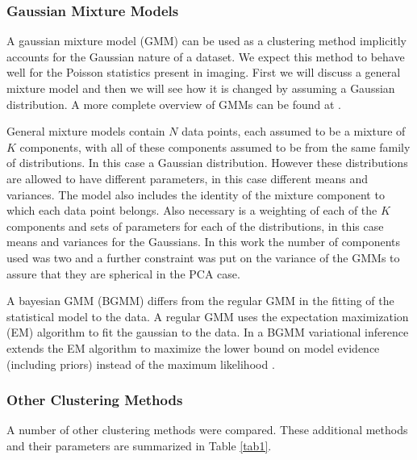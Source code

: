 \documentclass[a4paper,11pt]{article}
\begin{document}
\subsubsection{Gaussian Mixture Models}

A gaussian mixture model (GMM) can be used as a clustering method implicitly accounts for the Gaussian nature of a dataset. We expect this method to behave well for the Poisson statistics present in imaging. First we will discuss a general mixture model and then we will see how it is changed by assuming a Gaussian distribution. A more complete overview of GMMs can be found at \cite{DinovExpectationTutorial}.

General mixture models contain $N$ data points, each assumed to be a mixture of $K$ components, with all of these components assumed to be from the same family of distributions. In this case a Gaussian distribution. However these distributions are allowed to have different parameters, in this case different means and variances. The model also includes the identity of the mixture component to which each data point belongs. Also necessary is a weighting of each of the $K$ components and sets of parameters for each of the distributions, in this case means and variances for the Gaussians. In this work the number of components used was two and a further constraint was put on the variance of the GMMs to assure that they are spherical in the PCA case.

A bayesian GMM (BGMM) differs from the regular GMM in the fitting of the statistical model to the data. A regular GMM uses the expectation maximization (EM) algorithm to fit the gaussian to the data. In a BGMM variational inference extends the EM algorithm to maximize the lower bound on model evidence (including priors) instead of the maximum likelihood \cite{Blei2006VariationalMixtures}.

\subsubsection{Other Clustering Methods}

A number of other clustering methods were compared. These additional methods and their parameters are summarized in Table \ref{tab1}.
\end{document}
